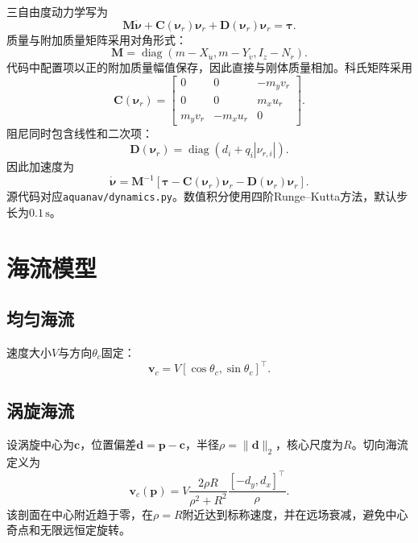 \documentclass[11pt,a4paper]{ctexart}
\begin{document}
三自由度动力学写为
\begin{equation}
\bm M\dot{\bm\nu}+\bm C(\bm\nu_r)\bm\nu_r+
\bm D(\bm\nu_r)\bm\nu_r=\bm\tau.
\end{equation}
质量与附加质量矩阵采用对角形式：
\begin{equation}
\bm M=\operatorname{diag}(m-X_{\dot u},m-Y_{\dot v},I_z-N_{\dot r}).
\end{equation}
代码中配置项以正的附加质量幅值保存，因此直接与刚体质量相加。科氏矩阵采用
\begin{equation}
\bm C(\bm\nu_r)=
\begin{bmatrix}
0&0&-m_yv_r\\
0&0&m_xu_r\\
m_yv_r&-m_xu_r&0
\end{bmatrix}.
\end{equation}
阻尼同时包含线性和二次项：
\begin{equation}
\bm D(\bm\nu_r)=\operatorname{diag}
\left(d_i+q_i|\nu_{r,i}|\right).
\end{equation}
因此加速度为
\begin{equation}
\dot{\bm\nu}=\bm M^{-1}
\left[\bm\tau-\bm C(\bm\nu_r)\bm\nu_r-
\bm D(\bm\nu_r)\bm\nu_r\right].
\end{equation}
源代码对应\texttt{aquanav/dynamics.py}。数值积分使用四阶Runge--Kutta方法，默认步长为$0.1\,\mathrm{s}$。

\section{海流模型}

\subsection{均匀海流}
速度大小$V$与方向$\theta_c$固定：
\begin{equation}
\bm v_c=V[\cos\theta_c,\sin\theta_c]^\top.
\end{equation}

\subsection{涡旋海流}
设涡旋中心为$\bm c$，位置偏差$\bm d=\bm p-\bm c$，半径$\rho=\|\bm d\|_2$，核心尺度为$R$。切向海流定义为
\begin{equation}
\bm v_c(\bm p)=V\frac{2\rho R}{\rho^2+R^2}
\frac{[-d_y,d_x]^\top}{\rho}.
\end{equation}
该剖面在中心附近趋于零，在$\rho=R$附近达到标称速度，并在远场衰减，避免中心奇点和无限远恒定旋转。
\end{document}
